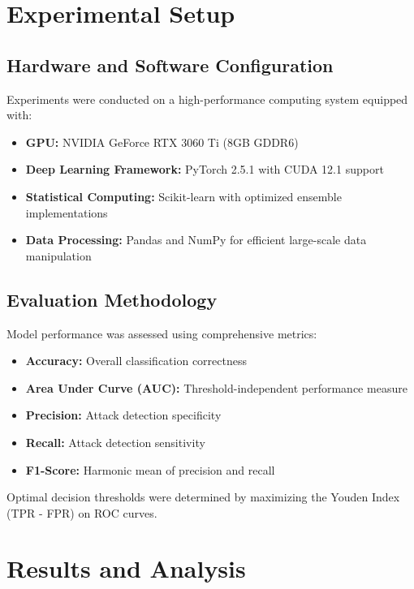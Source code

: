 \documentclass[conference]{IEEEtran}
\begin{document}
\section{Experimental Setup}

\subsection{Hardware and Software Configuration}
Experiments were conducted on a high-performance computing system equipped with:
\begin{itemize}
    \item \textbf{GPU:} NVIDIA GeForce RTX 3060 Ti (8GB GDDR6)
    \item \textbf{Deep Learning Framework:} PyTorch 2.5.1 with CUDA 12.1 support
    \item \textbf{Statistical Computing:} Scikit-learn with optimized ensemble implementations
    \item \textbf{Data Processing:} Pandas and NumPy for efficient large-scale data manipulation
\end{itemize}

\subsection{Evaluation Methodology}
Model performance was assessed using comprehensive metrics:
\begin{itemize}
    \item \textbf{Accuracy:} Overall classification correctness
    \item \textbf{Area Under Curve (AUC):} Threshold-independent performance measure
    \item \textbf{Precision:} Attack detection specificity
    \item \textbf{Recall:} Attack detection sensitivity  
    \item \textbf{F1-Score:} Harmonic mean of precision and recall
\end{itemize}

Optimal decision thresholds were determined by maximizing the Youden Index (TPR - FPR) on ROC curves.

\section{Results and Analysis}
\end{document}
